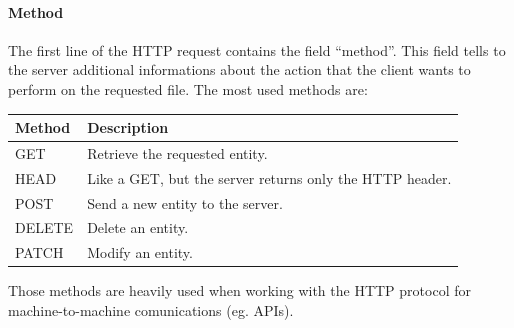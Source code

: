 \paragraph{Method}
The first line of the HTTP request contains the field ``method''. This field tells to the server additional informations about the action that the client wants to perform on the requested file. The most used methods are:
\begin{center}
    \begin{tabular}{l|l}
        \toprule
        \textbf{Method} & \textbf{Description}                                     \\
        \midrule
        GET             & Retrieve the requested entity.                           \\
        HEAD            & Like a GET, but the server returns only the HTTP header. \\
        POST            & Send a new entity to the server.                         \\
        DELETE          & Delete an entity.                                        \\
        PATCH           & Modify an entity.                                        \\
        \bottomrule
    \end{tabular}
\end{center}
Those methods are heavily used when working with the HTTP protocol for machine-to-machine comunications (eg. APIs).

